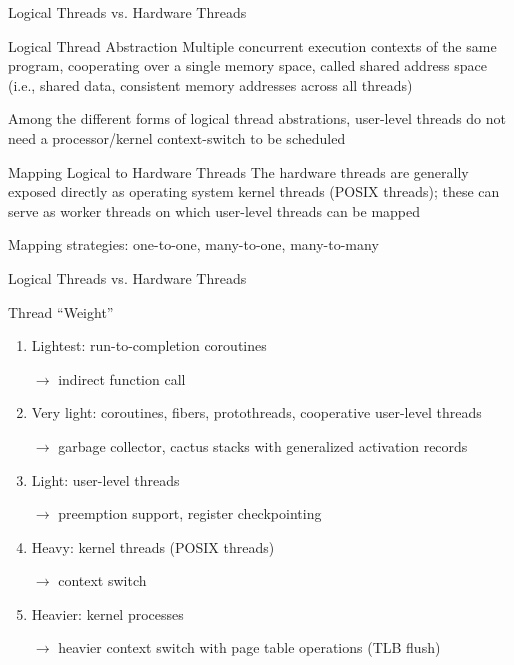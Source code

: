 \documentclass[xcolor=dvipsnames,9pt,mathserif]{beamer}
\renewcommand{\emph}[1]{\alert{#1}}
\begin{document}
\begin{frame}[c]{Logical Threads vs. Hardware Threads}
  \begin{block}{Logical Thread Abstraction}
    Multiple \emph{concurrent} execution contexts of the same program,
    cooperating over a single memory space, called \emph{shared
      address space} (i.e., shared data, consistent memory addresses
    across all threads)
  \end{block}

  Among the different forms of logical thread abstrations,
  \emph{user-level} threads do not need a processor/kernel
  context-switch to be scheduled
    
  \begin{block}{Mapping Logical to Hardware Threads}
    The hardware threads are generally exposed directly as operating
    system kernel threads (POSIX threads); these can serve as
    \emph{worker threads} on which user-level threads can be mapped

    Mapping strategies: one-to-one, many-to-one, \emph{many-to-many}
  \end{block}
\end{frame}

\begin{frame}{Logical Threads vs. Hardware Threads}
  \begin{block}{Thread ``Weight''}
    \begin{enumerate}
    \item Lightest: run-to-completion coroutines

      $\to$ indirect function call
    \item Very light: coroutines, fibers, protothreads,
      cooperative user-level threads

      $\to$ garbage collector, cactus stacks with generalized activation records
    \item Light: user-level threads

      $\to$ preemption support, register checkpointing
    \item Heavy: kernel threads (POSIX threads)

      $\to$ context switch
    \item Heavier: kernel processes

      $\to$ heavier context switch with page table operations (TLB flush)
    \end{enumerate}
  \end{block}
\end{frame}
\end{document}

